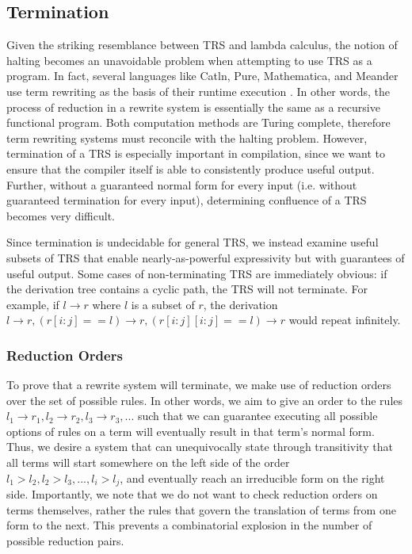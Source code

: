 \documentclass{article}
\begin{document}
\subsection{Termination}
Given the striking resemblance between TRS and lambda calculus,
the notion of halting becomes an unavoidable problem when attempting to use TRS as a program.
In fact, several languages like Catln, Pure, Mathematica, and Meander use term rewriting as the basis of their runtime execution \cite{catln,pure,mircea2004rule,meander}.
In other words, the process of reduction in a rewrite system is essentially the same as a recursive functional program.
Both computation methods are Turing complete, therefore term rewriting systems must reconcile with the halting problem.
However, termination of a TRS is especially important in compilation, since we want to ensure that the compiler itself
is able to consistently produce useful output.
Further, without a guaranteed normal form for every input (i.e. without guaranteed termination for every input),
determining confluence of a TRS becomes very difficult.

Since termination is undecidable for general TRS, we instead examine useful subsets of TRS
that enable nearly-as-powerful expressivity but with guarantees of useful output.
Some cases of non-terminating TRS are immediately obvious: if the derivation tree contains a cyclic path,
the TRS will not terminate. For example, if $l \rightarrow r$ where $l$ is a subset of $r$, the derivation
$l \rightarrow r, (r[i:j] == l) \rightarrow r, (r[i:j][i:j] == l) \rightarrow r$ would repeat infinitely.

\subsubsection{Reduction Orders}
To prove that a rewrite system will terminate, we make use of reduction orders over the set of possible rules.
In other words, we aim to give an order to the rules $l_1 \rightarrow r_1,l_2 \rightarrow r_2,l_3 \rightarrow r_3,...$
such that we can guarantee executing all possible options of rules on a term will eventually result in that term's normal form.
Thus, we desire a system that can unequivocally state through transitivity that all terms will start somewhere on the left side of the order $l_1 > l_2, l_2 > l_3, ..., l_i > l_j$,
and eventually reach an irreducible form on the right side.
Importantly, we note that we do not want to check reduction orders on terms themselves, rather the rules that govern the translation of terms from one form to the next.
This prevents a combinatorial explosion in the number of possible reduction pairs.
\end{document}
